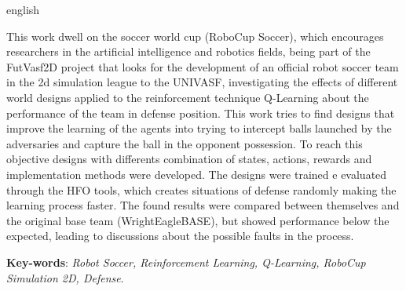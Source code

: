 \begin{resumo}[Abstract]
\begin{otherlanguage*}{english}

	This work dwell on the soccer world cup (RoboCup Soccer), which encourages
	researchers in the artificial intelligence and robotics fields, being part
	of the FutVasf2D project that looks for the development of an official robot
	soccer team in the 2d simulation league to the UNIVASF, investigating the
	effects of different world designs applied to the reinforcement technique
	Q-Learning about the performance of the team in defense position. This work
	tries to find designs that improve the learning of the agents into trying to
	intercept balls launched by the adversaries and capture the ball in the
	opponent possession. To reach this objective designs with differents
	combination of states, actions, rewards and implementation methods were
	developed. The designs were trained e evaluated through the HFO tools, which
	creates situations of defense randomly making the learning process faster.
	The found results were compared between themselves and the original base
	team (WrightEagleBASE), but showed performance below the expected, leading
	to discussions about the possible faults in the process.
	
	\vspace{\onelineskip}

	\noindent
	\textbf{Key-words}: \textit{Robot Soccer, Reinforcement Learning, Q-Learning, RoboCup Simulation 2D, Defense}.

\end{otherlanguage*}
\end{resumo}


